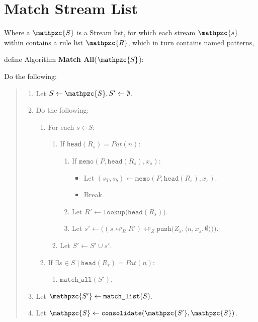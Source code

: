 \section{Match Stream List}

 \begin{framed}

  Where a $\mathpzc{S}$ is a Stream list, for which each stream $\mathpzc{s}$
  within contains a rule list $\mathpzc{R}$, which in turn contains named
  patterns,

  \vspace{12pt}

  define Algorithm \textbf{Match All}($\mathpzc{S}$):

  \vspace{12pt}
  Do the following: 
  
  \begin{quote}
  \begin{enumerate} 
   \item Let $S \leftarrow \mathpzc{S}, S' \leftarrow \emptyset$.
   \item Do the following:
   \begin{enumerate}
      \item For each ${s} \in {S}$:
      \begin{enumerate} 
         \item If \texttt{head}$({R_s}) = Pat(n)$:
         \begin{enumerate} 
           \item If $\texttt{memo}(P, \texttt{head}(R_s), x_s)$: 
           \begin{itemize} 
                 \item Let $(s_T, s_b) \leftarrow \texttt{memo}(P, \texttt{head}(R_s), x_s)$.
                 \item Break.
           \end{itemize} 
           \item Let $R' \leftarrow \texttt{lookup}\big(\texttt{head}({R_s})\big)$.
           \item Let ${s'} \leftarrow \Big( ({s} \looparrowleft_R R') \looparrowleft_Z 
                     \texttt{push}\big(Z_{s}, \langle n, x_{s}, \emptyset \rangle\big) \Big)$.
         \end{enumerate} 
         \item Let $S' \leftarrow S' \cup {s'}$.
      \end{enumerate} 
      \item If $\exists s \in S \mid \texttt{head}(R_s)=Pat(n)$:
      \begin{enumerate} 
        \item $\texttt{match\_all}(S')$.
      \end{enumerate} 
   \end{enumerate}
   \item Let $\mathpzc{S'} \leftarrow \texttt{match\_list}(S)$.
   \item Let $\mathpzc{S} \leftarrow \texttt{consolidate}(\mathpzc{S'}, \mathpzc{S})$.
  \end{enumerate}
  \end{quote}


\end{framed}
